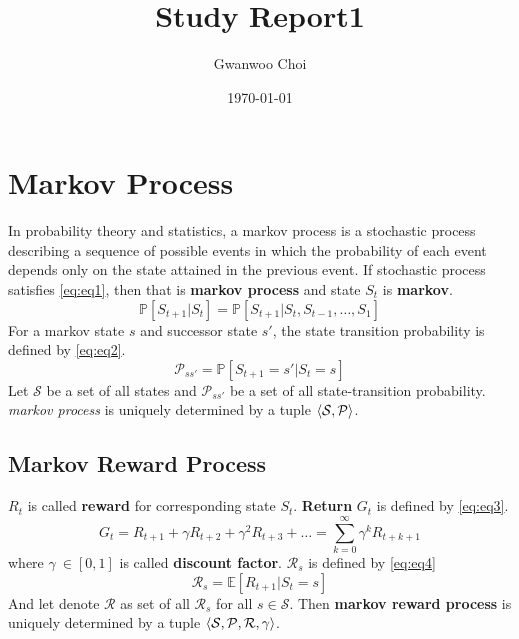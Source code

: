 \documentclass[
	10pt, %
]{article}
\newcommand{\mbb}[1]{\mathbb{#1}}
\newcommand{\mc}[1]{\mathcal{#1}}
\newcommand{\tb}[1]{\textbf{#1}}
\newcommand{\ti}[1]{\textit{#1}}
\begin{document}

\title{Study Report1}
\author{Gwanwoo Choi}
\date{\today}
\tableofcontents
\newpage
\section{Markov Process}
In probability theory and statistics, a markov process is a stochastic process describing a sequence of possible events in which the probability of each event depends only on the state attained in the previous event.
If stochastic process satisfies \cref{eq:eq1}, then that is \tb{markov process} and state $S_t$ is \tb{markov}.
\begin{equation} \label{eq:eq1}
    \mbb{P}[S_{t+1}|S_t] = \mbb{P}[S_{t+1}|S_t,S_{t-1},\dots,S_{1}]
\end{equation}
For a markov state $s$ and successor state $s'$, the state transition probability is defined by \cref{eq:eq2}.
\begin{equation} \label{eq:eq2}
    \mc{P}_{ss'} = \mbb{P}[S_{t+1} = s' | S_t = s]
\end{equation}
Let $\mc{S}$ be a set of all states and $\mc{P}_{ss'}$ be a set of all state-transition probability.
 \ti{markov process} is uniquely determined by a tuple $\braket{\mc{S}, \mc{P}}$. 


\subsection{Markov Reward Process}


$R_t$ is called \tb{reward} for corresponding state $S_t$. \tb{Return} $G_t$ is defined by \cref{eq:eq3}.   
\begin{equation} \label{eq:eq3}
    G_t = R_{t+1} + \gamma R_{t+2} + \gamma^2 R_{t+3} + \dots = \sum^{\infty}_{k=0}\gamma^k R_{t+k+1}
\end{equation}
where $\gamma \ \in [0,1] $ is called \tb{discount factor}.
$\mc{R}_s$ is defined by \cref{eq:eq4}
\begin{equation} \label{eq:eq4}
    \mc{R}_s = \mbb{E}[R_{t+1}|S_t=s]
\end{equation}
And let denote $\mc{R}$ as set of all $\mc{R}_s$ for all $s \in \mc{S}$. Then \tb{markov reward process} is uniquely determined by a tuple $\braket{\mc{S}, \mc{P}, \mc{R}, \gamma}$.
\end{document}

